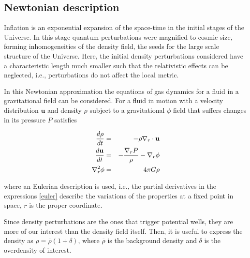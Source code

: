 \subsection{ Newtonian description  }


Inflation is an exponential expansion of the space-time in the initial stages of the 
Universe. In this stage quantum perturbations were magnified to cosmic size, forming 
inhomogeneities of the density field, the seeds for the large scale structure of the Universe. 
Here, the initial density perturbations considered have a characteristic length much smaller 
such that the relativistic effects can be neglected, i.e., perturbations do not affect the local
metric. 

In this Newtonian approximation the equations of gas dynamics for a fluid in a gravitational
field can be considered. For a fluid in motion with a velocity distribution $\textbf{u}$ and 
density $\rho$ subject to a gravitational $\phi$ field that suffers changes in its pressure $P$ 
satisfies 

\begin{eqnarray}
\frac{d \rho}{d t}&=& -\rho \nabla_r\cdot \textbf{u} \nonumber\\
\frac{d \textbf{u}}{d t} &=& -\frac{\nabla_r P}{\rho}-\nabla_r\phi \nonumber\\
\nabla_r^2 \phi & =& 4\pi G\rho 
\label{euler}
\end{eqnarray}

where an Eulerian description is used, i.e., the partial derivatives in the 
expressions \ref{euler} describe the variations of the properties at a fixed 
point in space, $r$ is the proper coordinate. 

Since density perturbations are the ones that trigger potential wells, they are 
more of our interest than the density field itself.
Then, it is useful to express the density as $\rho = \overline{\rho}(1 + \delta)$, where
$\overline{\rho}$ is the background density and $\delta$ is the overdensity of interest. 


